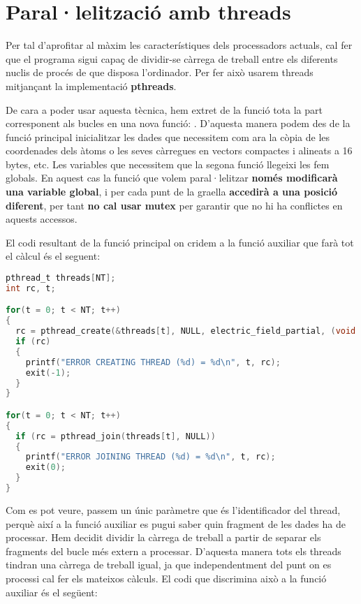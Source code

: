 
\section{Paral·lelització amb threads}

Per tal d'aprofitar al màxim les característiques dels processadors actuals, cal fer que el programa sigui capaç de dividir-se càrrega de treball entre els diferents nuclis de procés de que disposa l'ordinador. Per fer això usarem threads mitjançant la implementació \textbf{pthreads}.

De cara a poder usar aquesta tècnica, hem extret de la funció  tota la part corresponent als bucles en una nova funció: . D'aquesta manera podem des de la funció principal inicialitzar les dades que necessitem com ara la còpia de les coordenades dels àtoms o les seves càrregues en vectors compactes i alineats a 16 bytes, etc. Les variables que necessitem que la segona funció llegeixi les fem globals. En aquest cas la funció que volem paral·lelitzar \textbf{només modificarà una variable global}, i per cada punt de la graella \textbf{accedirà a una posició diferent}, per tant \textbf{no cal usar mutex} per garantir que no hi ha conflictes en aquests accessos.

El codi resultant de la funció principal on cridem a la funció auxiliar que farà tot el càlcul és el seguent:

\begin{lstlisting}[label=threads, caption=Creació de threads, language=C]
pthread_t threads[NT];
int rc, t;

for(t = 0; t < NT; t++)
{
  rc = pthread_create(&threads[t], NULL, electric_field_partial, (void *) t);
  if (rc)
  {
    printf("ERROR CREATING THREAD (%d) = %d\n", t, rc);
    exit(-1);
  }
}

for(t = 0; t < NT; t++)
{
  if (rc = pthread_join(threads[t], NULL))
  {
    printf("ERROR JOINING THREAD (%d) = %d\n", t, rc);
    exit(0);
  }
}
\end{lstlisting}

Com es pot veure, passem un únic paràmetre que és l'identificador del thread, perquè així a la funció auxiliar es pugui saber quin fragment de les dades ha de processar. Hem decidit dividir la càrrega de treball a partir de separar els fragments del bucle més extern a processar. D'aquesta manera tots els threads tindran una càrrega de treball igual, ja que independentment del punt on es processi cal fer els mateixos càlculs. El codi que discrimina això a la funció auxiliar és el següent:


